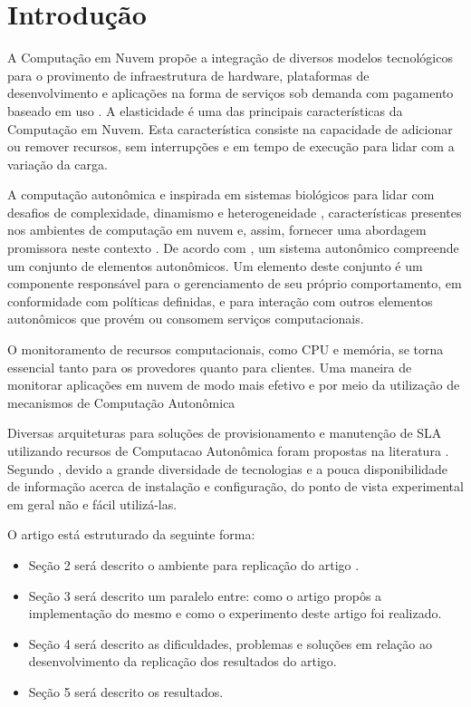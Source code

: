 \section{Introdução}

A Computação em Nuvem propõe a integração de diversos modelos tecnológicos para o
provimento de infraestrutura de hardware, plataformas de desenvolvimento e aplicações
na forma de serviços sob demanda com pagamento baseado em uso \cite{sa:11}. A elasticidade é uma das principais características da Computação em Nuvem. Esta característica consiste na capacidade de adicionar ou remover recursos, sem interrupções e em tempo de execução para lidar com a variação da carga. 

A computação autonômica e inspirada em sistemas biológicos para lidar com desafios de complexidade, dinamismo e heterogeneidade \cite{kephart:03}, características presentes nos ambientes de computação em nuvem e, assim, fornecer uma abordagem promissora neste contexto \cite{sousa:11}. De acordo com \cite{kephart:03}, um sistema autonômico compreende um conjunto de elementos autonômicos. Um elemento deste conjunto é um componente responsável para o gerenciamento de seu próprio comportamento, em conformidade com políticas definidas, e para interação com outros elementos autonômicos que provém ou consomem serviços computacionais.

O monitoramento de recursos computacionais, como CPU e memória, se torna 
essencial tanto para os provedores quanto para clientes. Uma maneira de monitorar
aplicações em nuvem de modo mais efetivo e por meio da utilização de mecanismos de 
Computação Autonômica

Diversas arquiteturas para soluções de provisionamento e manutenção de 
SLA utilizando recursos de Computacao Autonômica foram propostas na literatura 
\cite{rego:12,tordsson:12}. Segundo \cite{coutinho_et_al:14}, devido a grande diversidade de tecnologias e a pouca disponibilidade de informação acerca de instalação e configuração, do ponto de vista experimental em geral não e fácil utilizá-las.

O artigo está estruturado da seguinte forma:
\begin{itemize}
  \item Seção 2 será descrito o ambiente para replicação do artigo \cite{coutinho_et_al:14}.
  \item Seção 3 será descrito um paralelo entre: como o artigo propôs a implementação do mesmo e como o experimento deste artigo foi realizado.
  \item Seção 4 será descrito as dificuldades, problemas e soluções em relação ao desenvolvimento da replicação dos resultados do artigo.
  \item Seção 5 será descrito os resultados.
\end{itemize}
